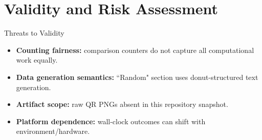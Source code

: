 \section{Validity and Risk Assessment}

\begin{frame}{Threats to Validity}
\small
\begin{itemize}
  \item \textbf{Counting fairness:} comparison counters do not capture all computational work equally.
  \item \textbf{Data generation semantics:} ``Random" section uses donut-structured text generation.
  \item \textbf{Artifact scope:} raw QR PNGs absent in this repository snapshot.
  \item \textbf{Platform dependence:} wall-clock outcomes can shift with environment/hardware.
\end{itemize}
\end{frame}
